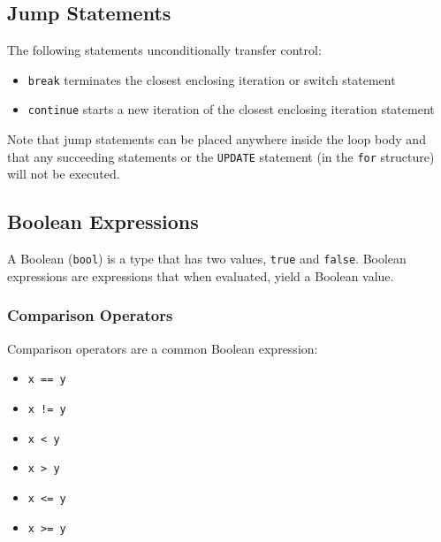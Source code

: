 \documentclass{article}
\begin{document}
\subsection{Jump Statements}
The following statements unconditionally transfer control:
\begin{itemize}
    \item \texttt{break} terminates the closest enclosing iteration or switch statement
    \item \texttt{continue} starts a new iteration of the closest enclosing iteration statement
\end{itemize}
Note that jump statements can be placed anywhere inside the loop body and that any succeeding
statements or the \texttt{UPDATE} statement (in the \texttt{for} structure)
will not be executed.
\subsection{Boolean Expressions}
A Boolean (\texttt{bool}) is a type that has two values,
\texttt{true} and \texttt{false}. Boolean
expressions are expressions that when evaluated, yield a Boolean value.
\subsubsection{Comparison Operators}
Comparison operators are a common Boolean expression:
\begin{itemize}
    \item \texttt{x == y}
    \item \texttt{x != y}
    \item \texttt{x < y}
    \item \texttt{x > y}
    \item \texttt{x <= y}
    \item \texttt{x >= y}
\end{itemize}
\end{document}
